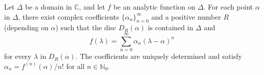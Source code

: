 Let $\Delta$ be a domain in $\mathbb{C}$, and let $f$ be an analytic function on $\Delta$. For each point $\alpha$ in $\Delta$, there exist complex coefficients $\{\alpha_n\}_{n=0}^{\infty}$ and a positive number $R$ (depending on $\alpha$) such that the disc $D_R(\alpha)$ is contained in $\Delta$ and
$$f(\lambda) = \sum_{n=0}^{\infty} \alpha_n (\lambda - \alpha)^n$$
for every $\lambda$ in $D_R(\alpha)$. The coefficients are uniquely determined and satisfy $\alpha_n = f^{(n)}(\alpha)/n!$ for all $n \in \mathbb{N}_0$.
